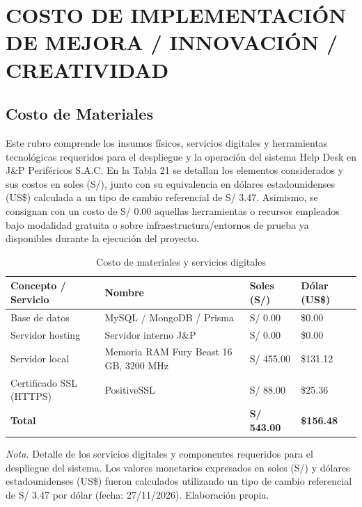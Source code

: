 \chapter[CAPÍTULO V]{COSTO DE IMPLEMENTACIÓN DE MEJORA / INNOVACIÓN / CREATIVIDAD}

\section{Costo de Materiales}

Este rubro comprende los insumos físicos, servicios digitales y herramientas tecnológicas requeridos para el despliegue y la operación del sistema Help Desk en J\&P Periféricos S.A.C. En la Tabla 21 se detallan los elementos considerados y sus costos en soles (S/), junto con su equivalencia en dólares estadounidenses (US\$) calculada a un tipo de cambio referencial de S/ 3.47. Asimismo, se consignan con un costo de S/ 0.00 aquellas herramientas o recursos empleados bajo modalidad gratuita o sobre infraestructura/entornos de prueba ya disponibles durante la ejecución del proyecto.

\begin{table}[htbp]
\centering
\caption{Costo de materiales y servicios digitales}
\label{tab:costo_materiales}
\begin{tabularx}{\textwidth}{@{}>{\raggedright\arraybackslash}p{3.4cm} >{\raggedright\arraybackslash}X >{\raggedleft\arraybackslash}p{2.2cm} >{\raggedleft\arraybackslash}p{2.2cm}@{}}
\toprule
\textbf{Concepto / Servicio} & \textbf{Nombre} & \textbf{Soles (S/)} & \textbf{Dólar (US\$)} \\
\midrule
Base de datos & MySQL / MongoDB / Prisma & S/ 0.00 & \$0.00 \\
Servidor hosting & Servidor interno J\&P & S/ 0.00 & \$0.00 \\
Servidor local & Memoria RAM Fury Beast 16 GB, 3200 MHz & S/ 455.00 & \$131.12 \\
Certificado SSL (HTTPS) & PositiveSSL & S/ 88.00 & \$25.36 \\
\midrule
\textbf{Total} & & \textbf{S/ 543.00} & \textbf{\$156.48} \\
\bottomrule
\end{tabularx}
\par\vspace{0.3em}
\raggedright\footnotesize{\textit{Nota.} Detalle de los servicios digitales y componentes requeridos para el despliegue del sistema. Los valores monetarios expresados en soles (S/) y dólares estadounidenses (US\$) fueron calculados utilizando un tipo de cambio referencial de S/ 3.47 por dólar (fecha: 27/11/2026). Elaboración propia.}
\end{table}

